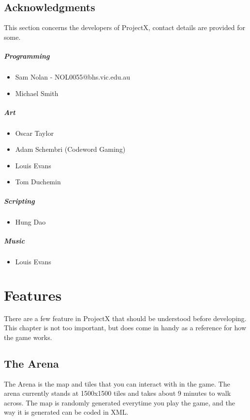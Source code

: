 \documentclass{book}
\newenvironment{ulist}
	{\begin{itemize}
			\itemsep0em}
	{\end{itemize}}
\begin{document}
	\section{Acknowledgments}
	This section concerns the developers of ProjectX, contact details are provided for some.
	
	\paragraph{Programming}
	\begin{ulist}
		\item Sam Nolan - NOL0055@bhs.vic.edu.au
		\item Michael Smith
	\end{ulist}
	
	\paragraph{Art}
	\begin{ulist}
		\item Oscar Taylor
		\item Adam Schembri (Codeword Gaming)
		\item Louis Evans
		\item Tom Duchemin
	\end{ulist}
	
	\paragraph{Scripting}
	\begin{ulist}
		\item Hung Dao
	\end{ulist}
	
	\paragraph{Music}
	\begin{ulist}
		\item Louis Evans
	\end{ulist}

	\chapter{Features}
	There are a few feature in ProjectX that should be understood before developing. This chapter is not too important, but does come in handy as a reference for how the game works.
	
	\section{The Arena}
	The Arena is the map and tiles that you can interact with in the game. The arena currently stands at 1500x1500 tiles and takes about 9 minutes to walk across. The map is randomly generated everytime you play the game, and the way it is generated can be coded in XML.
\end{document}
